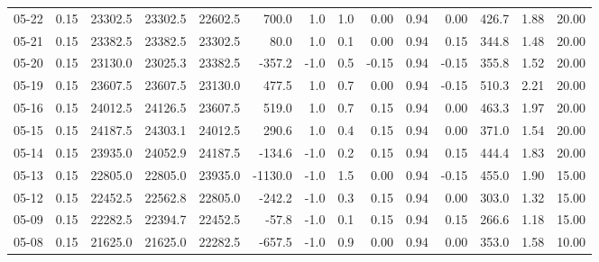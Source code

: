 \begin{threeparttable}
{\begin{tabular}{lrrrrrrrrrrrrr}
  05-22 &     0.15 & 23302.5 & 23302.5 & 22602.5 &      700.0 &                      1.0 &                 1.0 &       0.00 &      0.94 &           0.00 &            426.7 &            1.88 &                  20.00 \\
  05-21 &     0.15 & 23382.5 & 23382.5 & 23302.5 &       80.0 &                      1.0 &                 0.1 &       0.00 &      0.94 &           0.15 &            344.8 &            1.48 &                  20.00 \\
  05-20 &     0.15 & 23130.0 & 23025.3 & 23382.5 &     -357.2 &                     -1.0 &                 0.5 &      -0.15 &      0.94 &          -0.15 &            355.8 &            1.52 &                  20.00 \\
  05-19 &     0.15 & 23607.5 & 23607.5 & 23130.0 &      477.5 &                      1.0 &                 0.7 &       0.00 &      0.94 &          -0.15 &            510.3 &            2.21 &                  20.00 \\
  05-16 &     0.15 & 24012.5 & 24126.5 & 23607.5 &      519.0 &                      1.0 &                 0.7 &       0.15 &      0.94 &           0.00 &            463.3 &            1.97 &                  20.00 \\
  05-15 &     0.15 & 24187.5 & 24303.1 & 24012.5 &      290.6 &                      1.0 &                 0.4 &       0.15 &      0.94 &           0.00 &            371.0 &            1.54 &                  20.00 \\
  05-14 &     0.15 & 23935.0 & 24052.9 & 24187.5 &     -134.6 &                     -1.0 &                 0.2 &       0.15 &      0.94 &           0.15 &            444.4 &            1.83 &                  20.00 \\
  05-13 &     0.15 & 22805.0 & 22805.0 & 23935.0 &    -1130.0 &                     -1.0 &                 1.5 &       0.00 &      0.94 &          -0.15 &            455.0 &            1.90 &                  15.00 \\
  05-12 &     0.15 & 22452.5 & 22562.8 & 22805.0 &     -242.2 &                     -1.0 &                 0.3 &       0.15 &      0.94 &           0.00 &            303.0 &            1.32 &                  15.00 \\
  05-09 &     0.15 & 22282.5 & 22394.7 & 22452.5 &      -57.8 &                     -1.0 &                 0.1 &       0.15 &      0.94 &           0.15 &            266.6 &            1.18 &                  15.00 \\
  05-08 &     0.15 & 21625.0 & 21625.0 & 22282.5 &     -657.5 &                     -1.0 &                 0.9 &       0.00 &      0.94 &           0.00 &            353.0 &            1.58 &                  10.00 \\

\end{tabular}}
\end{threeparttable}
